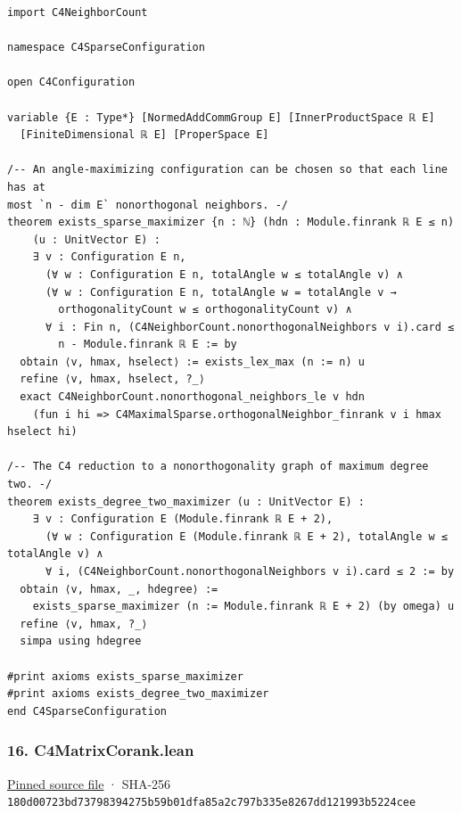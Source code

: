 \documentclass[11pt,a4paper]{article}
\begin{document}
\begin{Verbatim}[breaklines,breakanywhere,fontsize=\footnotesize]
import C4NeighborCount

namespace C4SparseConfiguration

open C4Configuration

variable {E : Type*} [NormedAddCommGroup E] [InnerProductSpace ℝ E]
  [FiniteDimensional ℝ E] [ProperSpace E]

/-- An angle-maximizing configuration can be chosen so that each line has at
most `n - dim E` nonorthogonal neighbors. -/
theorem exists_sparse_maximizer {n : ℕ} (hdn : Module.finrank ℝ E ≤ n)
    (u : UnitVector E) :
    ∃ v : Configuration E n,
      (∀ w : Configuration E n, totalAngle w ≤ totalAngle v) ∧
      (∀ w : Configuration E n, totalAngle w = totalAngle v →
        orthogonalityCount w ≤ orthogonalityCount v) ∧
      ∀ i : Fin n, (C4NeighborCount.nonorthogonalNeighbors v i).card ≤
        n - Module.finrank ℝ E := by
  obtain ⟨v, hmax, hselect⟩ := exists_lex_max (n := n) u
  refine ⟨v, hmax, hselect, ?_⟩
  exact C4NeighborCount.nonorthogonal_neighbors_le v hdn
    (fun i hi => C4MaximalSparse.orthogonalNeighbor_finrank v i hmax hselect hi)

/-- The C4 reduction to a nonorthogonality graph of maximum degree two. -/
theorem exists_degree_two_maximizer (u : UnitVector E) :
    ∃ v : Configuration E (Module.finrank ℝ E + 2),
      (∀ w : Configuration E (Module.finrank ℝ E + 2), totalAngle w ≤ totalAngle v) ∧
      ∀ i, (C4NeighborCount.nonorthogonalNeighbors v i).card ≤ 2 := by
  obtain ⟨v, hmax, _, hdegree⟩ :=
    exists_sparse_maximizer (n := Module.finrank ℝ E + 2) (by omega) u
  refine ⟨v, hmax, ?_⟩
  simpa using hdegree

#print axioms exists_sparse_maximizer
#print axioms exists_degree_two_maximizer
end C4SparseConfiguration
\end{Verbatim}

\subsubsection{16. C4MatrixCorank.lean}\label{c4matrixcorank.lean}

\href{https://github.com/mpelteshki/climbing-to-the-frontier/blob/29fbb70da18564048f62492e43870f2f96a65463/cagent/p1/C4MatrixCorank.lean}{Pinned source file} · SHA-256 \texttt{180d0072\allowbreak{}3bd73798\allowbreak{}394275b5\allowbreak{}9b01dfa8\allowbreak{}5a2c797b\allowbreak{}335e8267\allowbreak{}dd121993\allowbreak{}b5224cee}
\end{document}
